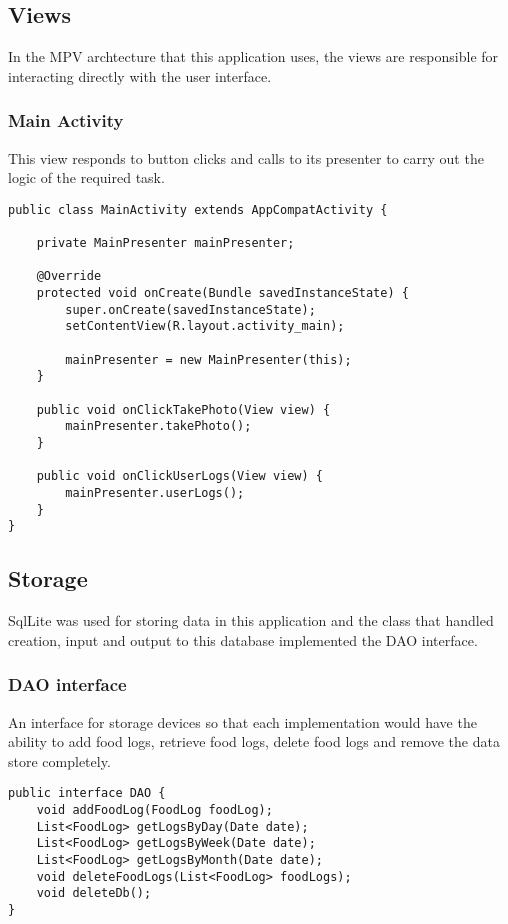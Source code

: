 \subsection*{Views}
In the MPV archtecture that this application uses, the views are responsible for interacting directly with the user interface.

\subsubsection*{Main Activity}
This view responds to button clicks and calls to its presenter to carry out the logic of the required task.
\begin{lstlisting}[style=Java]
public class MainActivity extends AppCompatActivity {

    private MainPresenter mainPresenter;

    @Override
    protected void onCreate(Bundle savedInstanceState) {
        super.onCreate(savedInstanceState);
        setContentView(R.layout.activity_main);

        mainPresenter = new MainPresenter(this);
    }

    public void onClickTakePhoto(View view) {
        mainPresenter.takePhoto();
    }

    public void onClickUserLogs(View view) {
        mainPresenter.userLogs();
    }
}
\end{lstlisting}

\subsection*{Storage}
SqlLite was used for storing data in this application and the class that handled creation, input and output to this database implemented the DAO interface.

\subsubsection*{DAO interface}
An interface for storage devices so that each implementation would have the ability to add food logs, retrieve food logs, delete food logs and remove the data store completely.
\begin{lstlisting}[style=Java]
public interface DAO {
    void addFoodLog(FoodLog foodLog);
    List<FoodLog> getLogsByDay(Date date);
    List<FoodLog> getLogsByWeek(Date date);
    List<FoodLog> getLogsByMonth(Date date);
    void deleteFoodLogs(List<FoodLog> foodLogs);
    void deleteDb();
}
\end{lstlisting}

